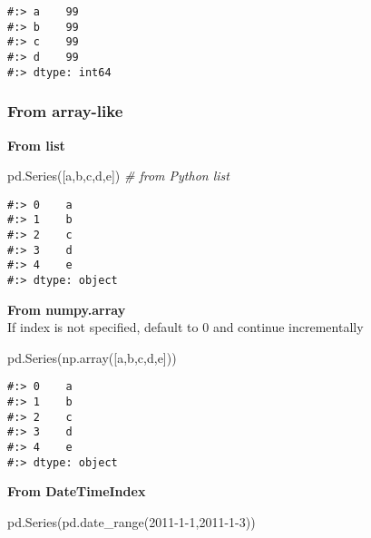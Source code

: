 \documentclass[
]{book}
\newenvironment{Shaded}{\begin{snugshade}}{\end{snugshade}}
\newcommand{\CommentTok}[1]{\textcolor[rgb]{0.37,0.37,0.37}{\textit{#1}}}
\newcommand{\NormalTok}[1]{#1}
\newcommand{\StringTok}[1]{\textcolor[rgb]{0.5,0.5,0.5}{#1}}
\begin{document}
\begin{verbatim}
#:> a    99
#:> b    99
#:> c    99
#:> d    99
#:> dtype: int64
\end{verbatim}

\hypertarget{from-array-like}{%
\subsubsection{From array-like}\label{from-array-like}}

\textbf{From list}

\begin{Shaded}
\begin{Highlighting}[]
\NormalTok{pd.Series([}\StringTok{\textquotesingle{}a\textquotesingle{}}\NormalTok{,}\StringTok{\textquotesingle{}b\textquotesingle{}}\NormalTok{,}\StringTok{\textquotesingle{}c\textquotesingle{}}\NormalTok{,}\StringTok{\textquotesingle{}d\textquotesingle{}}\NormalTok{,}\StringTok{\textquotesingle{}e\textquotesingle{}}\NormalTok{])           }\CommentTok{\# from Python list}
\end{Highlighting}
\end{Shaded}

\begin{verbatim}
#:> 0    a
#:> 1    b
#:> 2    c
#:> 3    d
#:> 4    e
#:> dtype: object
\end{verbatim}

\textbf{From numpy.array}\\
If index is not specified, default to 0 and continue incrementally

\begin{Shaded}
\begin{Highlighting}[]
\NormalTok{pd.Series(np.array([}\StringTok{\textquotesingle{}a\textquotesingle{}}\NormalTok{,}\StringTok{\textquotesingle{}b\textquotesingle{}}\NormalTok{,}\StringTok{\textquotesingle{}c\textquotesingle{}}\NormalTok{,}\StringTok{\textquotesingle{}d\textquotesingle{}}\NormalTok{,}\StringTok{\textquotesingle{}e\textquotesingle{}}\NormalTok{]))}
\end{Highlighting}
\end{Shaded}

\begin{verbatim}
#:> 0    a
#:> 1    b
#:> 2    c
#:> 3    d
#:> 4    e
#:> dtype: object
\end{verbatim}

\textbf{From DateTimeIndex}

\begin{Shaded}
\begin{Highlighting}[]
\NormalTok{pd.Series(pd.date\_range(}\StringTok{\textquotesingle{}2011{-}1{-}1\textquotesingle{}}\NormalTok{,}\StringTok{\textquotesingle{}2011{-}1{-}3\textquotesingle{}}\NormalTok{))}
\end{Highlighting}
\end{Shaded}
\end{document}
